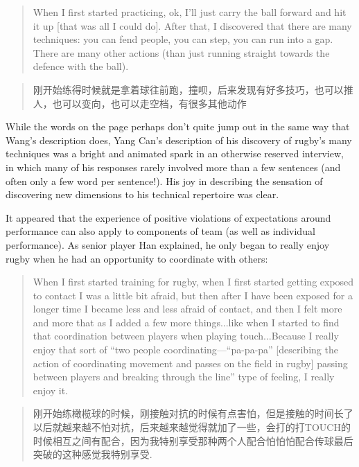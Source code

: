 \begin{CJK}{UTF8}{gbsn}
    \begin{quote}
      When I first started practicing, ok, I’ll just carry the ball forward and hit it up [that was all I could do]. After that, I discovered that there are many techniques: you can fend people, you can step, you can run into a gap. There are many other actions (than just running straight towards the defence with the ball).
    \end{quote}

    \begin{quote}
      刚开始练得时候就是拿着球往前跑，撞呗，后来发现有好多技巧，也可以推人，也可以变向，也可以走空档，有很多其他动作 
    \end{quote}

While the words on the page perhaps don't quite jump out in the same way that Wang's description does, Yang Can's description of his discovery of rugby's many techniques was a bright and animated spark in an otherwise reserved interview, in which many of his responses rarely involved more than a few sentences (and often only a few word per sentence!).  His joy in describing the sensation of discovering new dimensions to his technical repertoire was clear.

It appeared that the experience of positive violations of expectations around performance can also apply to components of team (as well as individual performance).  As senior player Han explained, he only began to really enjoy rugby when he had an opportunity to coordinate with others:

\begin{quote}
    When I first started training for rugby, when I first started getting exposed to contact I was a little bit afraid, but then after I have been exposed for a longer time I became less and less afraid of contact, and then I felt more and more that as I added a few more things...like when I started to find that coordination between players when playing touch...Because I really enjoy that sort of ``two people coordinating---``pa-pa-pa'' [describing the action of coordinating movement and passes on the field in rugby] passing between players and breaking through the line'' type of feeling, I really enjoy it.
\end{quote}

\begin{quote}
  	刚开始练橄榄球的时候，刚接触对抗的时候有点害怕，但是接触的时间长了以后就越来越不怕对抗，后来越来越觉得就加了一些，会打的打TOUCH的时候相互之间有配合，因为我特别享受那种两个人配合怕怕怕配合传球最后突破的这种感觉我特别享受.
\end{quote}


\end{CJK}
